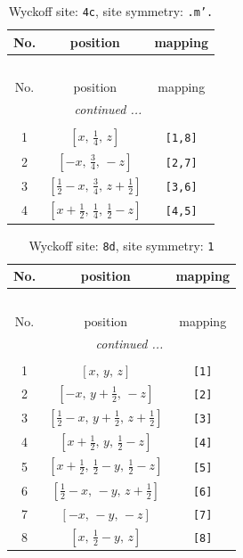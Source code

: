 \documentclass[fleqn,8pt]{jsarticle}
\begin{document}
\renewcommand{\arraystretch}{1.2}
\begin{longtable}{ccc}
\caption{Wyckoff site: {\tt 4c}, site symmetry: {\tt .m'.}}
 \\
 \hline \hline
No. & position & mapping \\ \hline \endfirsthead

\multicolumn{2}{l}{\tablename\ \thetable{}} \\
 \hline \hline
No. & position & mapping \\ \hline \endhead

 \hline \hline
\multicolumn{2}{r}{\footnotesize\it continued ...} \\ \endfoot

 \hline \hline
\multicolumn{2}{r}{} \\ \endlastfoot

1 & $\left[ x,\, \frac{1}{4},\, z \right]$ & {\tt [1,8]} \\ \hline
2 & $\left[ - x,\, \frac{3}{4},\, - z \right]$ & {\tt [2,7]} \\ \hline
3 & $\left[ \frac{1}{2} - x,\, \frac{3}{4},\, z + \frac{1}{2} \right]$ & {\tt [3,6]} \\ \hline
4 & $\left[ x + \frac{1}{2},\, \frac{1}{4},\, \frac{1}{2} - z \right]$ & {\tt [4,5]} \\
\end{longtable}
\renewcommand{\arraystretch}{1.2}
\begin{longtable}{ccc}
\caption{Wyckoff site: {\tt 8d}, site symmetry: {\tt 1}}
 \\
 \hline \hline
No. & position & mapping \\ \hline \endfirsthead

\multicolumn{2}{l}{\tablename\ \thetable{}} \\
 \hline \hline
No. & position & mapping \\ \hline \endhead

 \hline \hline
\multicolumn{2}{r}{\footnotesize\it continued ...} \\ \endfoot

 \hline \hline
\multicolumn{2}{r}{} \\ \endlastfoot

1 & $\left[ x,\, y,\, z \right]$ & {\tt [1]} \\ \hline
2 & $\left[ - x,\, y + \frac{1}{2},\, - z \right]$ & {\tt [2]} \\ \hline
3 & $\left[ \frac{1}{2} - x,\, y + \frac{1}{2},\, z + \frac{1}{2} \right]$ & {\tt [3]} \\ \hline
4 & $\left[ x + \frac{1}{2},\, y,\, \frac{1}{2} - z \right]$ & {\tt [4]} \\ \hline
5 & $\left[ x + \frac{1}{2},\, \frac{1}{2} - y,\, \frac{1}{2} - z \right]$ & {\tt [5]} \\ \hline
6 & $\left[ \frac{1}{2} - x,\, - y,\, z + \frac{1}{2} \right]$ & {\tt [6]} \\ \hline
7 & $\left[ - x,\, - y,\, - z \right]$ & {\tt [7]} \\ \hline
8 & $\left[ x,\, \frac{1}{2} - y,\, z \right]$ & {\tt [8]} \\
\end{longtable}
\end{document}

